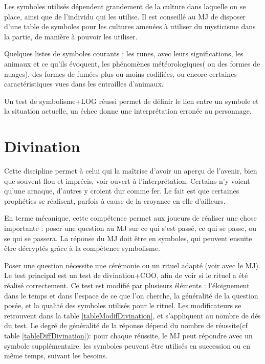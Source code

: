 \documentclass[10pt,a4paper,twocolumn]{book}
\begin{document}
Les symboles utilisés dépendent grandement de la culture dans laquelle on se place, ainsi que de l'individu qui les utilise. Il est conseillé au MJ de disposer d'une table de symboles pour les cultures amenées à utiliser du mysticisme dans la partie, de manière à pouvoir les utiliser.

Quelques listes de symboles courants : les runes, avec leurs significations, les animaux et ce qu'ils évoquent, les phénomènes météorologiques( ou des formes de nuages), des formes de fumées plus ou moins codifiées, ou encore certaines caractéristiques vues dans les entrailles d'animaux.

Un test de symbolisme+LOG réussi permet de définir le lien entre un symbole et la situation actuelle, un échec donne une interprétation erronée au personnage.
\section{Divination}
Cette discipline permet à celui qui la maîtrise d'avoir un aperçu de l'avenir, bien que souvent flou et imprécis, voir ouvert à l'interprétation. Certains n'y voient qu'une arnaque, d'autres y croient dur comme fer. Le fait est que certaines prophéties se réalisent, parfois à cause de la croyance en elle d'ailleurs.

En terme mécanique, cette compétence permet aux joueurs de réaliser une chose importante : poser une question au MJ sur ce qui s'est passé, ce qui se passe, ou se qui se passera. La réponse du MJ doit être en symboles, qui peuvent ensuite être décryptés grâce à la compétence symbolisme.

Poser une question nécessite une cérémonie ou un rituel adapté (voir avec le MJ). Le test principal est un test de divination+COO, afin de voir si le rituel a été réalisé correctement. Ce test est modifié par plusieurs éléments : l'éloignement dans le temps et dans l'espace de ce que l'on cherche, la généralité de la question posée, et la qualité des symboles utilisés pour le rituel. Les modificateurs se retrouvent dans la table \ref{tableModifDivination}, et s'appliquent au nombre de dés du test. Le degré de généralité de la réponse dépend du nombre de réussite(cf table \ref{tableDiffDivination}): pour chaque réussite, le MJ peut répondre avec un symbole supplémentaire. les symboles peuvent être utilisés en succession ou en même temps, suivant les besoins.
\end{document}
